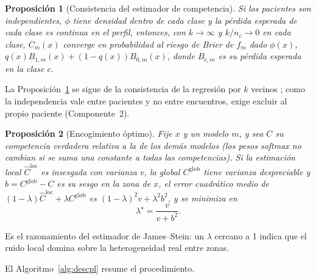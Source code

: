 \documentclass[pdflatex,sn-mathphys-num]{sn-jnl}
\theoremstyle{plain}
\newtheorem{proposicion}{Proposición}
\begin{document}
\begin{proposicion}[Consistencia del estimador de competencia]\label{prop:consistencia}
Si los pacientes son independientes, $\phi$ tiene densidad dentro de cada clase y la pérdida esperada de cada clase es continua en el perfil, entonces, con $k\to\infty$ y $k/n_c\to 0$ en cada clase, $C_m(x)$ converge en probabilidad al riesgo de Brier de $f_m$ dado $\phi(x)$, $q(x)B_{1,m}(x)+(1-q(x))B_{0,m}(x)$, donde $B_{c,m}$ es su pérdida esperada en la clase $c$.
\end{proposicion}

La Proposición~\ref{prop:consistencia} se sigue de la consistencia de la regresión por $k$ vecinos \cite{bib_stone_1977}; como la independencia vale entre pacientes y no entre encuentros, exige excluir al propio paciente (Componente~2).

\begin{proposicion}[Encogimiento óptimo]\label{prop:encogimiento}
Fije $x$ y un modelo $m$, y sea $C$ su competencia verdadera relativa a la de los demás modelos (los pesos softmax no cambian si se suma una constante a todas las competencias). Si la estimación local $\hat{C}^{\text{loc}}$ es insesgada con varianza $v$, la global $C^{\text{glob}}$ tiene varianza despreciable y $b=C^{\text{glob}}-C$ es su sesgo en la zona de $x$, el error cuadrático medio de $(1-\lambda)\hat{C}^{\text{loc}}+\lambda C^{\text{glob}}$ es $(1-\lambda)^2 v+\lambda^2 b^2$, y se minimiza en
\begin{equation}
\lambda^\star = \frac{v}{v+b^2}.
\label{eq:lambda_optimo}
\end{equation}
\end{proposicion}

Es el razonamiento del estimador de James--Stein: un $\lambda$ cercano a 1 indica que el ruido local domina sobre la heterogeneidad real entre zonas.

El Algoritmo~\ref{alg:descpl} resume el procedimiento.
\end{document}
